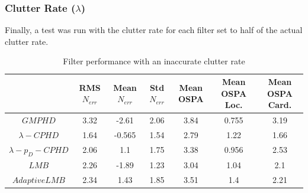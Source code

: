 \documentclass{article}
\begin{document}
\subsubsection*{Clutter Rate ($\lambda$)}
Finally, a test was run with the clutter rate for each filter set to half of the actual clutter rate.
\begin{table}[H]
  \centering
  \begin{tabular}{ c| c | c | c | c | c | c }
    & RMS $N_{err}$ & Mean $N_{err}$ & Std $N_{err}$ & Mean OSPA & Mean OSPA Loc. & Mean OSPA Card.\\
    \hline
    $GMPHD$ & 3.32 & -2.61 & 2.06 & 3.84 & 0.755 & 3.19 \\
    $\lambda-CPHD$ & 1.64 & -0.565 & 1.54 & 2.79 & 1.22 & 1.66 \\
    $\lambda-p_D-CPHD$ & 2.06 & 1.1 & 1.75 & 3.38 & 0.956 & 2.53 \\
    $LMB$ & 2.26 & -1.89 & 1.23 & 3.04 & 1.04 & 2.1 \\
  $Adaptive LMB$ & 2.34 & 1.43 & 1.85 & 3.51 & 1.4 & 2.21 \\
\end{tabular}  
  \caption{Filter performance with an inaccurate clutter rate}
  \label{tab:low_clutter}
\end{table}
\end{document}
